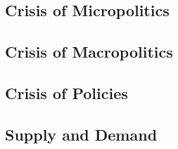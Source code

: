 \subsection{Crisis of Micropolitics}

\subsection{Crisis of Macropolitics}

	
\subsection{Crisis of Policies}

\subsection{Supply and Demand}




